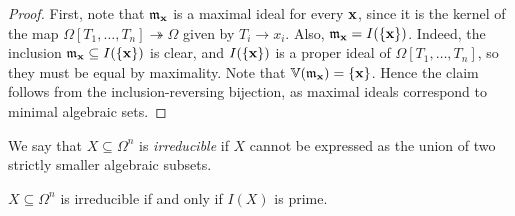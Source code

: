 \begin{proof}
    First, note that \( \mathfrak m_{\vb x} \) is a maximal ideal for every \( \vb x \), since it is the kernel of the map \( \Omega[T_1, \dots, T_n] \twoheadrightarrow \Omega \) given by \( T_i \to x_i \).
    Also, \( \mathfrak m_{\vb x} = I(\qty{\vb x}) \).
    Indeed, the inclusion \( \mathfrak m_{\vb x} \subseteq I(\qty{\vb x}) \) is clear, and \( I(\qty{\vb x}) \) is a proper ideal of \( \Omega[T_1, \dots, T_n] \), so they must be equal by maximality.
    Note that \( \mathbb V(\mathfrak m_{\vb x}) = \qty{\vb x} \).
    Hence the claim follows from the inclusion-reversing bijection, as maximal ideals correspond to minimal algebraic sets.
\end{proof}
\begin{definition}
    We say that \( X \subseteq \Omega^n \) is \emph{irreducible} if \( X \) cannot be expressed as the union of two strictly smaller algebraic subsets.
\end{definition}
\begin{proposition}
    \( X \subseteq \Omega^n \) is irreducible if and only if \( I(X) \) is prime.
\end{proposition}
